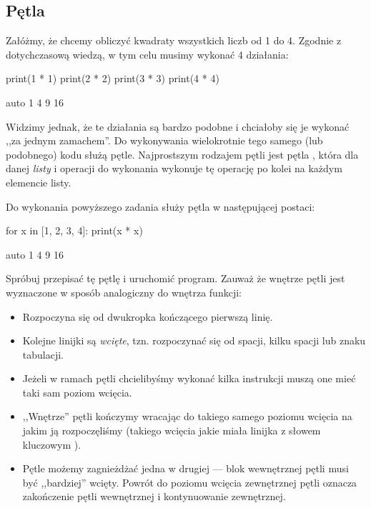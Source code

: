 \subsection{Pętla }
Załóżmy, że chcemy obliczyć kwadraty wszystkich liczb od 1 do 4.
Zgodnie z dotychczasową wiedzą, w tym celu musimy wykonać 4 działania:

\begin{CodeFrame}[python]{.5\textwidth}
print(1 * 1)
print(2 * 2)
print(3 * 3)
print(4 * 4)
\end{CodeFrame}
\begin{CodeFrame}{auto}
1
4
9
16
\end{CodeFrame}

Widzimy jednak, że te działania są bardzo podobne i chciałoby się je wykonać ,,za jednym zamachem''.
Do wykonywania wielokrotnie tego samego (lub podobnego) kodu służą pętle.
Najprostszym rodzajem pętli jest pętla , która dla danej \emph{listy} i operacji do wykonania
wykonuje tę operację po kolei na każdym elemencie listy.

Do wykonania powyższego zadania służy pętla  w następującej postaci:

\begin{CodeFrame}[python]{.5\textwidth}
for x in [1, 2, 3, 4]:
    print(x * x)
\end{CodeFrame}
\begin{CodeFrame}{auto}
1
4
9
16
\end{CodeFrame}

\noindent Spróbuj przepisać tę pętlę i uruchomić program.
Zauważ że wnętrze pętli jest wyznaczone w sposób analogiczny do wnętrza funkcji:
\begin{itemize}
	\item Rozpoczyna się od dwukropka kończącego pierwszą linię.
	\item Kolejne linijki są \emph{wcięte}, tzn. rozpoczynać się od spacji, kilku spacji lub znaku tabulacji.
	\item Jeżeli w ramach pętli chcielibyśmy wykonać kilka instrukcji muszą one mieć taki sam poziom wcięcia.
	\item ,,Wnętrze'' pętli kończymy wracając do takiego samego poziomu wcięcia na jakim ją rozpoczęliśmy
	      (takiego wcięcia jakie miała linijka z słowem kluczowym ).
	\item Pętle możemy zagnieżdżać jedna w drugiej --- blok wewnętrznej pętli musi być ,,bardziej'' wcięty.
	Powrót do poziomu wcięcia zewnętrznej pętli oznacza zakończenie pętli wewnętrznej i kontynuowanie zewnętrznej.
\end{itemize}

